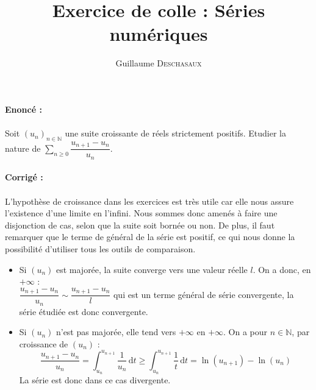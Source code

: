 \documentclass{article}
\title{Exercice de colle : Séries numériques}
\author{Guillaume \textsc{Deschasaux}}
\date{}
\newcommand{\N}{\mathbb{N}}   %
\begin{document}
\maketitle

\textbf{Enoncé :}
\\ \\ Soit $(u_{n})_{n \in \N} $ une suite croissante de réels strictement positifs. Etudier la nature de $\sum_{n \ge 0}^{} \dfrac{u_{n+1}-u_{n}}{u_{n}}$.
\\ \\ 
\textbf{Corrigé :}
\\ \\ L'hypothèse de croissance dans les exercices est très utile car elle nous assure l'existence d'une limite en l'infini. Nous sommes donc amenés à faire une disjonction de cas, selon que la suite soit bornée ou non. De plus, il faut remarquer que le terme de général de la série est positif, ce qui nous donne la possibilité d'utiliser tous les outils de comparaison.

\begin{itemize}[label=$\bullet$]
\item Si $(u_n)$ est majorée, la suite converge vers une valeur réelle $l$. On a donc, en $+\infty$ : 
\\ $\dfrac{u_{n+1}-u_{n}}{u_{n}} \sim \dfrac{u_{n+1}-u_{n}}{l} $ qui est un terme général de série convergente, la série étudiée est donc convergente.

\item Si $(u_n)$ n'est pas majorée, elle tend vers $+\infty$ en $+\infty$. On a pour $n \in \N$, par croissance de $(u_n)$ :
\begin{equation}
\dfrac{u_{n+1}-u_{n}}{u_{n}}=\displaystyle \int_{u_n}^{u_{n+1}} \dfrac{1}{u_n} \, \mathrm{d}t \ge \displaystyle \int_{u_n}^{u_{n+1}} \dfrac{1}{t} \, \mathrm{d}t
=\ln(u_{n+1})-\ln(u_n)
\end{equation}
La série est donc dans ce cas divergente.
\end{itemize}
\end{document}
